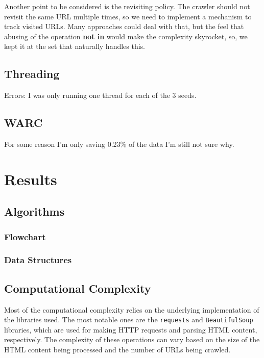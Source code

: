 Another point to be considered is the revisiting policy. The crawler should not revisit the same URL multiple times, so we need to implement a mechanism to track visited URLs. Many approaches could deal with that, but the feel that abusing of the operation \textbf{not in} would make the complexity skyrocket, so, we kept it at the set that naturally handles this.

\subsection{Threading}

Errors: I was only running one thread for each of the 3 seeds.

\subsection{WARC}

For some reason I'm only saving 0.23\% of the data I'm still not sure why.

\section{Results}

\subsection{Algorithms}

\subsubsection{Flowchart}

\subsubsection{Data Structures}

\subsection{Computational Complexity}

Most of the computational complexity relies on the underlying implementation of the libraries used. The most notable ones are the \texttt{requests} and \texttt{BeautifulSoup} libraries, which are used for making HTTP requests and parsing HTML content, respectively. The complexity of these operations can vary based on the size of the HTML content being processed and the number of URLs being crawled.

